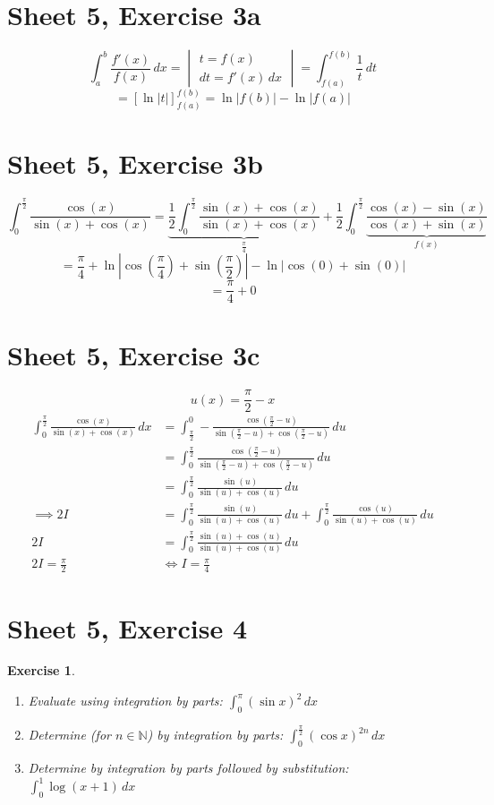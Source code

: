 \documentclass{article}
\newtheorem{ex}{Exercise} %
\newcommand{\card}[1]{\left|#1\right|}
\begin{document}
\section{Sheet 5, Exercise 3a}
\[ \int_a^b \frac{f'(x)}{f(x)} \, dx = \begin{vmatrix} t = f(x) \\ dt = f'(x) \, dx \end{vmatrix} = \int_{f(a)}^{f(b)} \frac{1}{t} \, dt \]
\[ = \left[\ln\card{t}\right]_{f(a)}^{f(b)} = \ln\card{f(b)} - \ln\card{f(a)} \]

\section{Sheet 5, Exercise 3b}
\[
  \int_0^{\frac\pi2} \frac{\cos(x)}{\sin(x) + \cos(x)} = \underbrace{\frac12 \int_0^{\frac\pi2} \frac{\sin(x) + \cos(x)}{\sin(x) + \cos(x)}}_{\frac\pi4} + \frac12 \int_0^{\frac\pi2} \underbrace{\frac{\cos(x) - \sin(x)}{\cos(x) + \sin(x)}}_{f(x)}
\] \[
  = \frac\pi4 + \ln{\card{\cos(\frac\pi4) + \sin(\frac\pi2)} - \ln\card{\cos(0) + \sin(0)}}
\] \[
  = \frac\pi4 + 0
\]

\section{Sheet 5, Exercise 3c}
\[ u(x) = \frac\pi2 - x \]
\begin{align*}
  \int_0^{\frac\pi2} \frac{\cos(x)}{\sin(x) + \cos(x)} \, dx
  &= \int_{\frac\pi2}^0 -\frac{\cos(\frac\pi2 - u)}{\sin(\frac\pi2 - u) + \cos(\frac\pi2 - u)} \, du \\
  &= \int_0^{\frac\pi2} \frac{\cos(\frac\pi2 - u)}{\sin(\frac\pi2 - u) + \cos(\frac\pi2 - u)} \, du \\
  &= \int_0^{\frac\pi2} \frac{\sin(u)}{\sin(u) + \cos(u)} \, du \\
  \implies 2I &= \int_0^{\frac\pi2} \frac{\sin(u)}{\sin(u) + \cos(u)} \, du + \int_0^{\frac\pi2} \frac{\cos(u)}{\sin(u) + \cos(u)} \, du \\
  2I &= \int_0^{\frac\pi2} \frac{\sin(u) + \cos(u)}{\sin(u) + \cos(u)} \, du \\
  2I = \frac\pi2 &\iff I = \frac\pi4
\end{align*}

\section{Sheet 5, Exercise 4}
\begin{ex}
  \begin{enumerate}
    \item Evaluate using integration by parts: $\int_0^\pi (\sin{x})^2 \, dx$
    \item Determine (for $n \in \mathbb N$) by integration by parts: $\int_0^{\frac\pi2} (\cos{x})^{2n} \, dx$
    \item Determine by integration by parts followed by substitution: $\int_0^1 \log(x  + 1) \, dx$
  \end{enumerate}
\end{ex}
\end{document}
